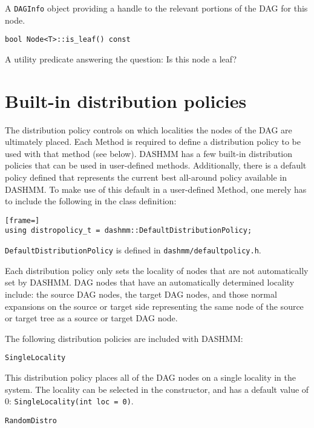 \noindent A \texttt{DAGInfo} object providing a handle to the relevant portions
of the DAG for this node.

\begin{lstlisting}
bool Node<T>::is_leaf() const
\end{lstlisting}

\noindent A utility predicate answering the question: Is this node a leaf?


\section{Built-in distribution policies}

The distribution policy controls on which localities the nodes of the DAG
are ultimately placed. Each Method is required to define a distribution policy
to be used with that method (see below). DASHMM has a few built-in distribution
policies that can be used in user-defined methods. Additionally, there is a
default policy defined that represents the current best all-around policy
available in DASHMM. To make use of this default in a user-defined Method,
one merely has to include the following in the class definition:

\begin{lstlisting}[frame=]
using distropolicy_t = dashmm::DefaultDistributionPolicy;
\end{lstlisting}

\noindent \texttt{DefaultDistributionPolicy} is defined in
\texttt{dashmm/defaultpolicy.h}.

Each distribution policy only sets the locality of nodes that are not
automatically set by DASHMM. DAG nodes that have an automatically determined
locality include: the source DAG nodes, the target DAG nodes, and those
normal expansions on the source or target side representing the same node of
the source or target tree as a source or target DAG node.

The following distribution policies are included with DASHMM:

\begin{lstlisting}
SingleLocality
\end{lstlisting}

\noindent This distribution policy places all of the DAG nodes on a single
locality in the system. The locality can be selected in the constructor, and
has a default value of 0: \texttt{SingleLocality(int loc = 0)}.

\begin{lstlisting}
RandomDistro
\end{lstlisting}

